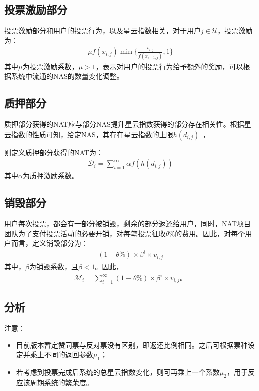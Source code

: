 \subsection{投票激励部分}
投票激励部分和用户的投票行为，以及星云指数相关，对于用户$j \in \mathcal{U}$，投票激励为：
\begin{align}
\mu f(x_{i,j}) \min\{\frac{v_{i,j}}{f(x_{i-1,j})},1\}
\end{align}
\noindent 其中$\mu$为投票激励系数，$\mu > 1$，表示对用户的投票行为给予额外的奖励，可以根据系统中流通的NAS的数量变化调整。

\subsection{质押部分}
质押部分获得的NAT应与部分NAS提升星云指数获得的部分存在相关性。根据星云指数的性质可知，给定NAS，其存在星云指数的上限$h(d_{i,j})$~\cite{ImproveNR}，

则定义质押部分获得的NAT为：
\begin{align}
\mathcal{D}_i = \sum_{i=1}^{\infty}\alpha f(h(d_{i,j}))
\end{align}
\noindent 其中$\alpha$为质押激励系数。


\subsection{销毁部分}
\label{burn}
用户每次投票，都会有一部分被销毁，剩余的部分返还给用户，同时，NAT项目团队为了支付投票活动的必要开销，对每笔投票征收$\theta\%$的费用。因此，对每个用户而言，定义销毁部分为：
\begin{align}
(1-\theta\%) \times \beta^i \times v_{i,j}
\end{align}
\noindent 其中，$\beta$为销毁系数，且$\beta < 1$。因此，
\begin{align}
    \mathcal{M}_i = \sum_{i=1}^{\infty} (1-\theta\%) \times \beta^i \times v_{i,j} 。
\end{align}

\subsection{分析}

注意：
\begin{itemize}
\item 目前版本暂定赞同票与反对票没有区别，即返还比例相同。之后可根据票种设定并乘上不同的返回参数$\mu_1$；
\item 若考虑到投票完成后系统的总星云指数变化，则可再乘上一个系数$\mu_2$，用于反应该周期系统的繁荣度。
\end{itemize}


